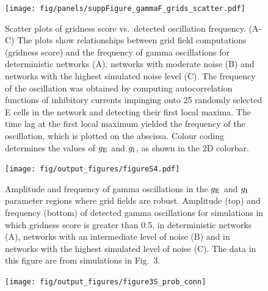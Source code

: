\documentclass[a4paper,12pt]{article}
\newcommand{\ssc}[3]{\ensuremath{#1_{\text{#2}_{\text{#3}}}}}
\newcommand{\gE      }{\ssc{g}      {\scriptsize{E}}{}}
\newcommand{\gI      }{\ssc{g}      {\scriptsize{I}}{}}
\begin{document}
\clearpage

\begin{figure}[ht!]
    \internallinenumbers
    \centering
        \texttt{[image: fig/panels/suppFigure\_gammaF\_grids\_scatter.pdf]}
    \caption{Scatter plots of gridness score vs.\ detected oscillation
    frequency.  (A-C) The plots show relationships between grid field
    computations (gridness score) and the frequency of gamma oscillations for
    deterministic networks (A), networks with moderate noise (B) and networks
    with the highest simulated noise level (C).  The frequency of the
    oscillation was obtained by computing autocorrelation functions of
    inhibitory currents impinging onto 25 randomly selected E cells in the
    network and detecting their first local maxima.  The time lag at the first
    local maximum yielded the frequency of the oscillation, which is plotted on
    the abscissa. Colour coding determines the values of $\gE$ and $\gI$, as
    shown in the 2D colorbar.}
\end{figure}

\clearpage

\begin{figure}[p]
    \internallinenumbers
    \centering
        \texttt{[image: fig/output\_figures/figureS4.pdf]}
    \caption{Amplitude and frequency of gamma oscillations in the $\gE$ and
    $\gI$ parameter regions where grid fields are robust. Amplitude (top) and
    frequency (bottom) of detected gamma oscillations for simulations in which
    gridness score is greater than 0.5, in deterministic networks (A), networks
    with an intermediate level of noise (B) and in networks with the highest
    simulated level of noise (C). The data in this figure are from simulations
    in Fig.~3.}
\end{figure}

\clearpage

\begin{figure}[p]
    \internallinenumbers
    \centering
        \texttt{[image: fig/output\_figures/figure3S\_prob\_conn]}
\end{figure}

\clearpage
\end{document}
